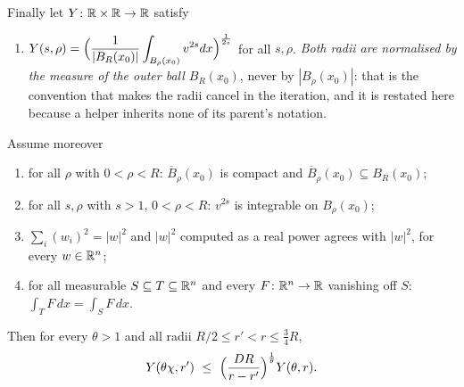 \begin{helper}
Finally let $Y\colon\mathbb{R}\times\mathbb{R}\to\mathbb{R}$ satisfy
\begin{enumerate}
\item[(H8)] $\displaystyle Y(s,\rho)=\Bigl(\frac1{|B_R(x_0)|}
  \int_{B_\rho(x_0)}v^{2s}dx\Bigr)^{\frac1{2s}}$ for all $s,\rho$.
  \emph{Both radii are normalised by the measure of the outer ball
  $B_R(x_0)$}, never by $|B_\rho(x_0)|$: that is the convention that makes the
  radii cancel in the iteration, and it is restated here because a helper
  inherits none of its parent's notation.
\end{enumerate}
Assume moreover
\begin{enumerate}
\item[(H9)] for all $\rho$ with $0<\rho<R$: $\overline B_\rho(x_0)$ is compact
  and $\overline B_\rho(x_0)\subseteq B_R(x_0)$;
\item[(H10)] for all $s,\rho$ with $s>1$, $0<\rho<R$: $v^{2s}$ is integrable on
  $B_\rho(x_0)$;
\item[(H11)] $\sum_i(w_i)^2=|w|^2$ and $|w|^{2}$ computed as a real power
  agrees with $|w|^2$, for every $w\in\mathbb{R}^n$;
\item[(H12)] for all measurable $S\subseteq T\subseteq\mathbb{R}^n$ and every
  $F\colon\mathbb{R}^n\to\mathbb{R}$ vanishing off $S$: $\int_TF\,dx=\int_SF\,dx$.
\end{enumerate}
Then for every $\theta>1$ and all radii $R/2\le r'<r\le\frac34R$,
\[
Y(\theta\chi,r')\ \le\ \Bigl(\frac{DR}{r-r'}\Bigr)^{\frac1\theta}Y(\theta,r).
\]
\end{helper}
